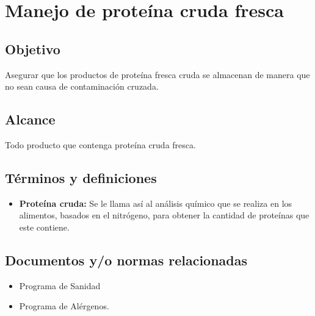 \renewcommand{\MayorVer}{2}
\renewcommand{\MenorVer}{1}
\renewcommand{\Codigo}{PSA-1-PROG} %
\renewcommand{\FechaPub}{2023--01}
\renewcommand{\Titulo}{Manejo de proteína cruda fresca}

\section{\Titulo}
\label{PRO-ManejoDeProtFresca}



\subsection{Objetivo}

Asegurar que los productos de proteína fresca cruda se almacenan de manera que no sean causa de contaminación cruzada.

\subsection{Alcance}

Todo producto que contenga proteína cruda fresca.

\subsection{Términos y definiciones}

\begin{itemize}
	\item \textbf{Proteína cruda:} Se le llama así al análisis químico que se realiza en los alimentos, basados en el nitrógeno, para obtener la cantidad de proteínas que este contiene.
\end{itemize}

\subsection{Documentos y/o normas relacionadas}

\begin{itemize}
	\item Programa de Sanidad
	\item Programa de Alérgenos.
\end{itemize}

